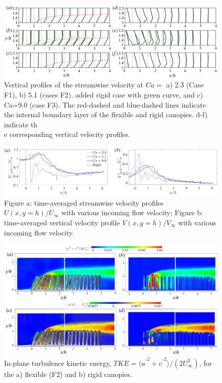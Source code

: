 \documentclass[lineno,authoryear]{FLO_v1}%
\theoremstyle{definition}
\begin{document}
\begin{figure}
	\includegraphics[width=\textwidth]{U_V_profiles}
	\caption{Vertical profiles of the streamwise velocity at $Ca=$ a) 2.3 (Case F1), b) 5.1 (cases F2), added rigid case with green curve, and c) Ca=9.0 (case F3). The red-dashed and blue-dashed lines indicate the internal boundary layer of the flexible and rigid canopies. d-f) indicate th\\
		e corresponding vertical velocity profiles.}
	\label{uprofile}
\end{figure}





\begin{figure}
	\centering
		\includegraphics[width=1\linewidth]{U_V_y1}
	\caption{Figure a: time-averaged streamwise velocity profiles $U(x,y=h)/U_{\infty}$ with various incoming flow velocity; Figure b: time-averaged vertical velocity profile $V(x,y=h)/V_{\infty}$ with various incoming flow velocity.}
	\label{velocity_yh}
\end{figure}

 

 

\begin{figure}
	\centerline{\includegraphics[width=1\textwidth]{TKE_uw}}
	\caption{In-plane turbulence kinetic energy, $TKE = \langle {u^{\prime}}^2 + {v^{\prime}}^2 \rangle/(2U_{\infty}^2)$, for the a) flexible (F2) and b) rigid canopies. }
	\label{TKE_contour}
\end{figure}
\end{document}

